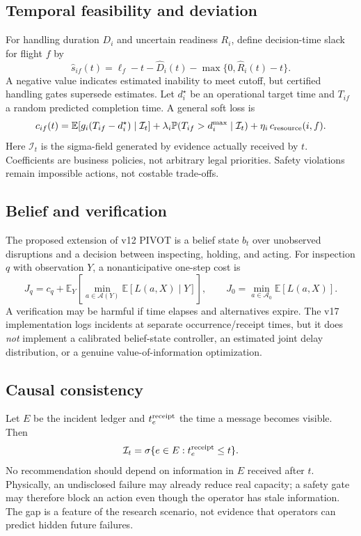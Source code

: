 \documentclass[10pt,a4paper]{article}
\theoremstyle{definition}\newtheorem{definition}[theorem]{Definition}
\theoremstyle{remark}\newtheorem{remark}[theorem]{Remark}
\newcommand{\I}{\mathcal I}
\newcommand{\A}{\mathcal A}
\newcommand{\E}{\mathbb E}
\newcommand{\Prb}{\mathbb P}
\newcommand{\1}{\mathbbm 1}
\begin{document}
\subsection{Temporal feasibility and deviation}
For handling duration $D_i$ and uncertain readiness $R_i$, define decision-time slack for flight $f$ by
\begin{equation}\hat s_{if}(t)=\ell_f-t-\hat D_i(t)-\max\{0,\hat R_i(t)-t\}.\end{equation}
A negative value indicates estimated inability to meet cutoff, but certified handling gates supersede estimates. Let $d_i^\star$ be an operational target time and $T_{if}$ a random predicted completion time. A general soft loss is
\begin{equation}c_{if}(t)=\E[g_i(T_{if}-d_i^\star)\mid\I_t]+\lambda_i\Prb(T_{if}>d_i^{\max}\mid\I_t)+\eta_i\,c_{\rm resource}(i,f).\end{equation}
Here $\I_t$ is the sigma-field generated by evidence actually received by $t$. Coefficients are business policies, not arbitrary legal priorities. Safety violations remain impossible actions, not costable trade-offs.

\subsection{Belief and verification}
The proposed extension of v12 PIVOT is a belief state $b_t$ over unobserved disruptions and a decision between inspecting, holding, and acting. For inspection $q$ with observation $Y$, a nonanticipative one-step cost is
\begin{equation}J_q=c_q+\E_Y\!\left[\min_{a\in\A(Y)}\E[L(a,X)\mid Y]\right],\qquad J_0=\min_{a\in\A_0}\E[L(a,X)].\end{equation}
A verification may be harmful if time elapses and alternatives expire. The v17 implementation logs incidents at separate occurrence/receipt times, but it does \emph{not} implement a calibrated belief-state controller, an estimated joint delay distribution, or a genuine value-of-information optimization.

\subsection{Causal consistency}
Let $E$ be the incident ledger and $t_e^{\rm receipt}$ the time a message becomes visible. Then
\begin{equation}\I_t=\sigma\{e\in E:t_e^{\rm receipt}\le t\}.\end{equation}
No recommendation should depend on information in $E$ received after $t$. Physically, an undisclosed failure may already reduce real capacity; a safety gate may therefore block an action even though the operator has stale information. The gap is a feature of the research scenario, not evidence that operators can predict hidden future failures.
\end{document}
